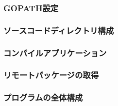 
\subsubsection{GOPATH設定}

\subsubsection{ソースコードディレクトリ構成}

\subsubsection{コンパイルアプリケーション}

\subsubsection{リモートパッケージの取得}

\subsubsection{プログラムの全体構成}


